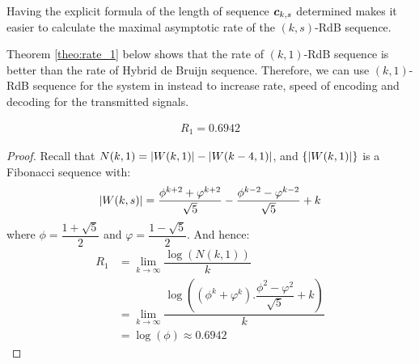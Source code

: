 Having the explicit formula of the length of sequence ${\boldsymbol c}_{k,s}$ determined makes it easier to calculate the maximal asymptotic rate of the $(k,s)$-RdB sequence.

Theorem \ref{theo:rate_1} below shows that the rate of $(k,1)$-RdB sequence is better than the rate of Hybrid de Bruijn sequence. Therefore, we can use $(k,1)$-RdB sequence for the system in \cite{zhang2021timing} instead to increase rate, speed of encoding and decoding for the transmitted signals.

\begin{theorem}\label{theo:rate_1}
    \begin{align}
        R_{1} = 0.6942
    \end{align}
\end{theorem}
\begin{proof}
    Recall that $N(k,1) = \left \lvert W(k,1) \right \rvert - \left \lvert W(k-4,1) \right \rvert$, and $\{\left \lvert W(k,1) \right \rvert\}$ is a Fibonacci sequence with: 
    \[\left \lvert W(k,s) \right \rvert = \dfrac{\phi^{k+2}+\varphi^{k+2}}{\sqrt{5}}-\dfrac{\phi^{k-2}-\varphi^{k-2}}{\sqrt{5}} + k\]
    where $\phi = \dfrac{1+\sqrt{5}}{2}$ and $\varphi = \dfrac{1-\sqrt{5}}{2}$.
    And hence:
    \begin{align*}
        R_{1} &= \lim_{k\to\infty}\dfrac{\log(N(k,1))}{k} \\
        &= \lim_{k\to\infty}\dfrac{ \log\left( \left(\phi^{k}+\varphi^{k}\right).\dfrac{\phi^{2}-\varphi^{2}}{\sqrt{5}}+k \right) }{k} \\
        &= \log(\phi) \approx 0.6942
    \end{align*}
\end{proof}

